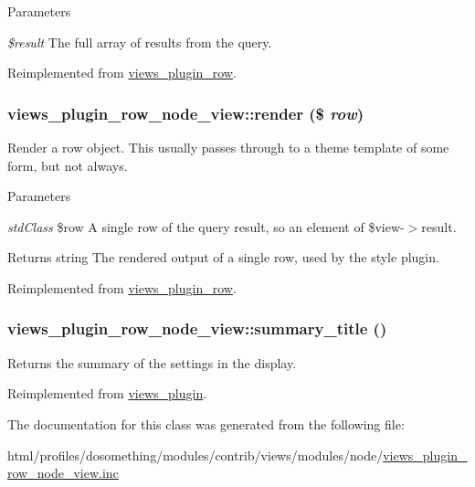 \begin{DoxyParams}{Parameters}
\item[{\em \$result}]The full array of results from the query. \end{DoxyParams}


Reimplemented from \hyperlink{classviews__plugin__row_ae49a23f750874e4b3d294aa3a20ecd64}{views\_\-plugin\_\-row}.\hypertarget{classviews__plugin__row__node__view_a54c188103326e10c26a466d896e6d74b}{
\subsubsection[{render}]{\setlength{\rightskip}{0pt plus 5cm}views\_\-plugin\_\-row\_\-node\_\-view::render (\$ {\em row})}}
\label{classviews__plugin__row__node__view_a54c188103326e10c26a466d896e6d74b}
Render a row object. This usually passes through to a theme template of some form, but not always.


\begin{DoxyParams}{Parameters}
\item[{\em stdClass}]\$row A single row of the query result, so an element of \$view-\/$>$result.\end{DoxyParams}
\begin{DoxyReturn}{Returns}
string The rendered output of a single row, used by the style plugin. 
\end{DoxyReturn}


Reimplemented from \hyperlink{classviews__plugin__row_a8243842e087dd28664b32cef0309f2a6}{views\_\-plugin\_\-row}.\hypertarget{classviews__plugin__row__node__view_a64b0c17198744b817ca0246e0d973aad}{
\subsubsection[{summary\_\-title}]{\setlength{\rightskip}{0pt plus 5cm}views\_\-plugin\_\-row\_\-node\_\-view::summary\_\-title ()}}
\label{classviews__plugin__row__node__view_a64b0c17198744b817ca0246e0d973aad}
Returns the summary of the settings in the display. 

Reimplemented from \hyperlink{classviews__plugin_a9a4aaece48a7cf465dd95d59a3bc5ea1}{views\_\-plugin}.

The documentation for this class was generated from the following file:\begin{DoxyCompactItemize}
\item 
html/profiles/dosomething/modules/contrib/views/modules/node/\hyperlink{views__plugin__row__node__view_8inc}{views\_\-plugin\_\-row\_\-node\_\-view.inc}\end{DoxyCompactItemize}
